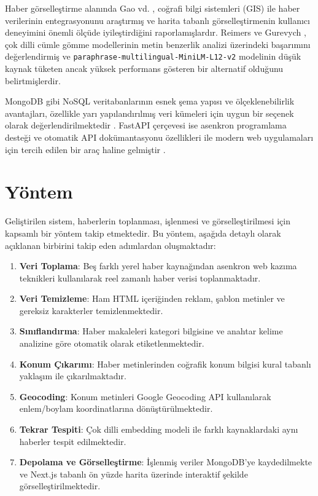 \documentclass[conference]{IEEEtran}
\begin{document}
Haber görselleştirme alanında Gao vd. \cite{gao2020}, coğrafi bilgi sistemleri (GIS) ile haber verilerinin entegrasyonunu araştırmış ve harita tabanlı görselleştirmenin kullanıcı deneyimini önemli ölçüde iyileştirdiğini raporlamışlardır. Reimers ve Gurevych \cite{reimers2019}, çok dilli cümle gömme modellerinin metin benzerlik analizi üzerindeki başarımını değerlendirmiş ve \texttt{paraphrase-multilingual-MiniLM-L12-v2} modelinin düşük kaynak tüketen ancak yüksek performans gösteren bir alternatif olduğunu belirtmişlerdir.

MongoDB gibi NoSQL veritabanlarının esnek şema yapısı ve ölçeklenebilirlik avantajları, özellikle yarı yapılandırılmış veri kümeleri için uygun bir seçenek olarak değerlendirilmektedir \cite{mongodb2024}. FastAPI çerçevesi ise asenkron programlama desteği ve otomatik API dokümantasyonu özellikleri ile modern web uygulamaları için tercih edilen bir araç haline gelmiştir \cite{fastapi2024}.

\section{Yöntem}
\label{sec:method}

Geliştirilen sistem, haberlerin toplanması, işlenmesi ve görselleştirilmesi için kapsamlı bir yöntem takip etmektedir. Bu yöntem, aşağıda detaylı olarak açıklanan birbirini takip eden adımlardan oluşmaktadır:

\begin{enumerate}
    \item \textbf{Veri Toplama}: Beş farklı yerel haber kaynağından asenkron web kazıma teknikleri kullanılarak reel zamanlı haber verisi toplanmaktadır.
    \item \textbf{Veri Temizleme}: Ham HTML içeriğinden reklam, şablon metinler ve gereksiz karakterler temizlenmektedir.
    \item \textbf{Sınıflandırma}: Haber makaleleri kategori bilgisine ve anahtar kelime analizine göre otomatik olarak etiketlenmektedir.
    \item \textbf{Konum Çıkarımı}: Haber metinlerinden coğrafik konum bilgisi kural tabanlı yaklaşım ile çıkarılmaktadır.
    \item \textbf{Geocoding}: Konum metinleri Google Geocoding API kullanılarak enlem/boylam koordinatlarına dönüştürülmektedir.
    \item \textbf{Tekrar Tespiti}: Çok dilli embedding modeli ile farklı kaynaklardaki aynı haberler tespit edilmektedir.
    \item \textbf{Depolama ve Görselleştirme}: İşlenmiş veriler MongoDB'ye kaydedilmekte ve Next.js tabanlı ön yüzde harita üzerinde interaktif şekilde görselleştirilmektedir.
\end{enumerate}
\end{document}
